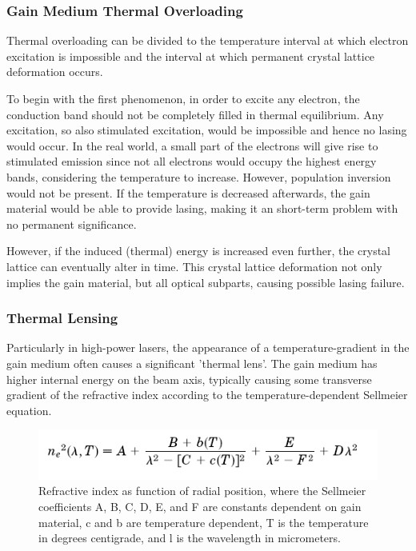 	\subsubsection{Gain Medium Thermal Overloading}
		\label{mtLSRthermaloverload}	
Thermal overloading can be divided to the temperature interval at which electron excitation is impossible and the interval at which permanent crystal lattice deformation occurs.

To begin with the first phenomenon, in order to excite any electron, the conduction band should not be completely filled in thermal equilibrium. Any excitation, so also stimulated excitation, would be impossible and hence no lasing would occur. In the real world, a small part of the electrons will give rise to stimulated emission since not all electrons would occupy the highest energy bands, considering the temperature to increase. However, population inversion would not be present. If the temperature is decreased afterwards, the gain material would be able to provide lasing, making it an short-term problem with no permanent significance. 

However, if the induced (thermal) energy is increased even further, the crystal lattice can eventually alter in time. This crystal lattice deformation not only implies the gain material, but all optical subparts, causing possible lasing failure. 

	\subsubsection{Thermal Lensing}
		\label{mtLSRthermallensing}
Particularly in high-power lasers, the appearance of a temperature-gradient in the gain medium often causes a significant 'thermal lens'. The gain medium has higher internal energy on the beam axis, typically causing some transverse gradient of the refractive index according to the temperature-dependent Sellmeier equation. 

\begin{figure} [ht]
	\begin{center}
\includegraphics[scale=1]{chapters/img/TISE.png}	
\caption{Refractive index as function of radial position, where the Sellmeier coefficients A, B, C, D, E, and F are constants dependent on gain material, c and b are temperature dependent, T is the temperature in degrees centigrade, and l is the wavelength in micrometers.}
\label{thermal_lensing}
\end{center}
\end{figure}

